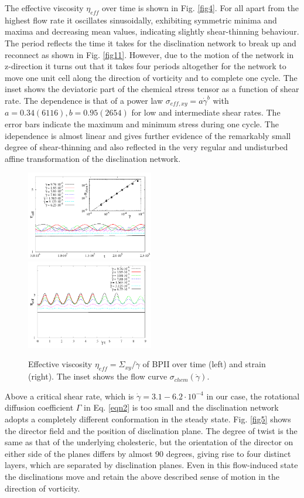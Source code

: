 \documentclass[aps,pre,reprint,superscriptaddress]{revtex4}
\begin{document}
The effective viscosity $\eta_{eff}$ over time is shown in Fig. \ref{fig4}. 
For all apart from the highest flow rate it oscillates sinusoidally, exhibiting symmetric minima and maxima and decreasing mean values, indicating slightly shear-thinning behaviour.
The period reflects the time it takes for the disclination network to break up and reconnect as shown in Fig. \ref{fig11}.
However, due to the motion of the network in z-direction it turns out that it takes four periods altogether for the network to move one unit cell along the direction of vorticity and to complete one cycle.
The inset shows the deviatoric part of the chemical stress tensor as a function of shear rate.
The dependence is that of a power law $\sigma_{eff, xy}=a \dot{\gamma}^b$ with $a=0.34(6116), b=0.95(2654)$ for low and intermediate shear rates. 
The error bars indicate the maximum and minimum stress during one cycle.
The idependence is almost linear and gives further evidence of the remarkably small degree of shear-thinning and also reflected in the very regular and undisturbed affine transformation of the disclination network.  

\begin{figure}[h]
\includegraphics[width=0.495\textwidth]{stress_bp2.pdf}
\includegraphics[width=0.495\textwidth]{stress_vs_strain_bp2.pdf}
\caption{Effective viscosity $\eta_{eff}=\Sigma_{xy}/\dot{\gamma}$ of BPII over time (left) and strain (right). The inset shows the flow curve $\sigma_{chem}(\dot{\gamma})$.}
\label{bp2-rheo}
\end{figure}

Above a critical shear rate, which is $\dot{\gamma}=3.1-6.2\cdot 10^{-4}$ in our case, the rotational diffusion coefficient $\Gamma$ in Eq. \ref{eqn2} is too small and the disclination network adopts a completely different conformation in the steady state.
Fig. \ref{fig5} shows the director field and the position of disclination plane.
The degree of twist is the same as that of the underlying cholesteric, but the orientation of the director on either side of the planes differs by almost 90 degrees, giving rise to four distinct layers, which are separated by disclination planes.
Even in this flow-induced state the disclinations move and retain the above described sense of motion in the direction of vorticity.
\end{document}
